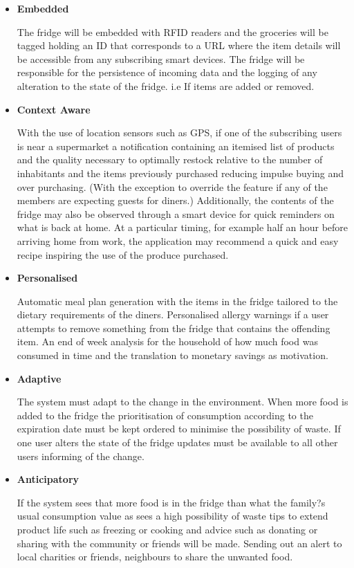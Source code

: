 \documentclass[a4paper, 11pt]{article}
\begin{document}
\begin{itemize}
  \item[] \textbf{Embedded}
  \begin{flushleft}  The fridge will be embedded with RFID readers and the groceries will be tagged holding an ID that corresponds to a URL where the item details will be accessible from any subscribing smart devices. The fridge will be responsible for the persistence of incoming data and the logging of any alteration to the state of the fridge. i.e If items are added or removed.
  \end{flushleft}
  \item[] \textbf{Context Aware} 
    \begin{flushleft} With the use of location sensors such as GPS, if one of the subscribing users is near a supermarket a notification containing an itemised list of products and the quality necessary to optimally restock relative to the number of inhabitants and the items previously purchased reducing impulse buying and over purchasing. (With the exception to override the feature if any of the members are expecting guests for diners.) Additionally, the contents of the fridge may also be observed through a smart device for quick reminders on what is back at home. At a particular timing, for example half an hour before arriving home from work, the application may recommend a quick and easy recipe inspiring the use of the produce purchased.
\end{flushleft}
  \item[] \textbf{Personalised} 
    \begin{flushleft} Automatic meal plan generation with the items in the fridge tailored to the dietary requirements of the diners. Personalised allergy warnings if a user attempts to remove something from the fridge that contains the offending item. An end of week analysis for the household of how much food was consumed in time and the translation to monetary savings as motivation.
\end{flushleft}
  \item[] \textbf{Adaptive} 
    \begin{flushleft} The system must adapt to the change in the environment. When more food is added to the fridge the prioritisation of consumption according to the expiration date must be kept ordered to minimise the possibility of waste. If one user alters the state of the fridge updates must be available to all other users informing of the change.
\end{flushleft}
  \item[] \textbf{Anticipatory} 
    \begin{flushleft} If the system sees that more food is in the fridge than what the family?s usual consumption value as sees a high possibility of waste tips to extend product life such as freezing or cooking and advice such as donating or sharing with the community or friends will be made. Sending out an alert to local charities or friends, neighbours to share the unwanted food. 
\end{flushleft}
\end{itemize}
\end{document}
